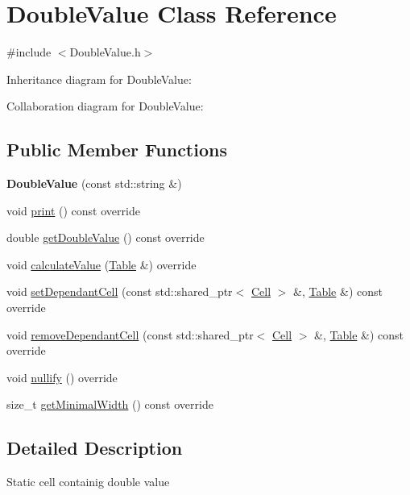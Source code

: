 \hypertarget{classDoubleValue}{}\section{Double\+Value Class Reference}
\label{classDoubleValue}


{\ttfamily \#include $<$Double\+Value.\+h$>$}



Inheritance diagram for Double\+Value\+:


Collaboration diagram for Double\+Value\+:
\subsection*{Public Member Functions}
\begin{DoxyCompactItemize}
\item 
\mbox{\label{classDoubleValue_aa37ea779e6ce9c2db2a763d774d7fa44}} 
{\bfseries Double\+Value} (const std\+::string \&)
\item 
void \hyperlink{classDoubleValue_a9c11fc60aedef2db2f43958c2e73eb95}{print} () const override
\item 
double \hyperlink{classDoubleValue_ac598795c18713db7e49d07acd5859076}{get\+Double\+Value} () const override
\item 
void \hyperlink{classDoubleValue_a81b080a38fbc9de10db424f0eb381fd9}{calculate\+Value} (\hyperlink{classTable}{Table} \&) override
\item 
void \hyperlink{classDoubleValue_a59437f80b42c8f3c058b87002e1fe0ec}{set\+Dependant\+Cell} (const std\+::shared\+\_\+ptr$<$ \hyperlink{classCell}{Cell} $>$ \&, \hyperlink{classTable}{Table} \&) const override
\item 
void \hyperlink{classDoubleValue_a7ec7477ff3eb36e7e012912c674850e4}{remove\+Dependant\+Cell} (const std\+::shared\+\_\+ptr$<$ \hyperlink{classCell}{Cell} $>$ \&, \hyperlink{classTable}{Table} \&) const override
\item 
void \hyperlink{classDoubleValue_a9a558315ff92a14907c4936ecdee9f5f}{nullify} () override
\item 
size\+\_\+t \hyperlink{classDoubleValue_a4b809052b3a6239196e344fac3119c09}{get\+Minimal\+Width} () const override
\end{DoxyCompactItemize}


\subsection{Detailed Description}
Static cell containig double value 

